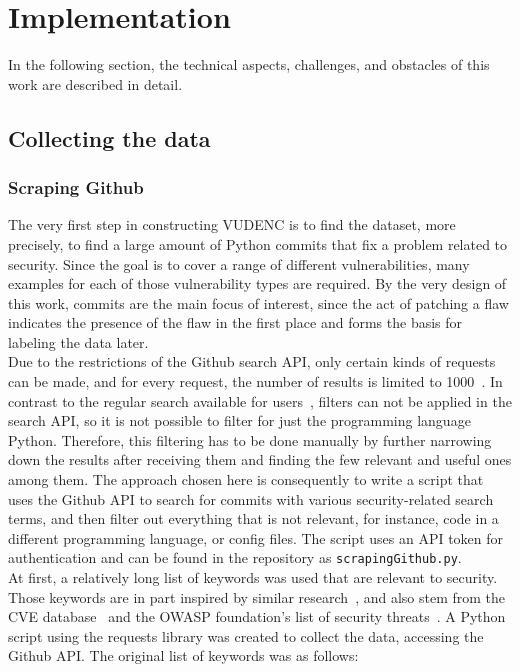 \documentclass[
a4paper,
pagesize,
pdftex,
12pt,
twoside, %
BCOR=5mm, %
ngerman,
fleqn,
final,
]{scrartcl}
\begin{document}
	
	
	\newpage
	\section{Implementation}\label{Implementation}
	In the following section, the technical aspects, challenges, and obstacles of this work are described in detail.
	
	\subsection{Collecting the data}
	\subsubsection{Scraping Github}
	The very first step in constructing VUDENC is to find the dataset, more precisely, to find a large amount of Python commits that fix a problem related to security. Since the goal is to cover a range of different vulnerabilities, many examples for each of those vulnerability types are required. By the very design of this work, commits are the main focus of interest, since the act of patching a flaw indicates the presence of the flaw in the first place and forms the basis for labeling the data later.\\	
	Due to the restrictions of the Github search API, only certain kinds of requests can be made, and for every request, the number of results is limited to 1000~\cite{Github.com.2}. In contrast to the regular search available for users~\cite{Github.com.2019}, filters can not be applied in the search API, so it is not possible to filter for just the programming language Python. Therefore, this filtering has to be done manually by further narrowing down the results after receiving them and finding the few relevant and useful ones among them.
	The approach chosen here is consequently to write a script that uses the Github API to search for commits with various security-related search terms, and then filter out everything that is not relevant, for instance, code in a different programming language, or config files. The script uses an API token for authentication and can be found in the repository as \texttt{scrapingGithub.py}.\\
	At first, a relatively long list of keywords was used that are relevant to security. Those keywords are in part inspired by similar research~\cite{Zhou.2017}, and also stem from the CVE database~\cite{CVE} and the OWASP foundation's list of security threats~\cite{OWASPFoundation.}. A Python script using the requests library was created to collect the data, accessing the Github API. The original list of keywords was as follows:
	\lstset{basicstyle=\small}
	
\end{document}
